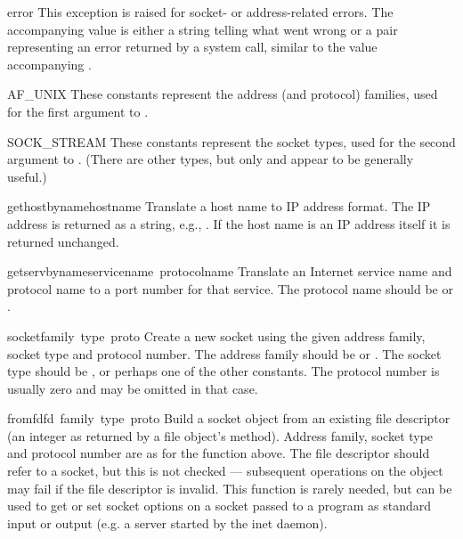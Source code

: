 \renewcommand{\indexsubitem}{(in module socket)}
\begin{excdesc}{error}
This exception is raised for socket- or address-related errors.
The accompanying value is either a string telling what went wrong or a
pair 
representing an error returned by a system
call, similar to the value accompanying .
\end{excdesc}

\begin{datadesc}{AF_UNIX}
These constants represent the address (and protocol) families,
used for the first argument to .
\end{datadesc}

\begin{datadesc}{SOCK_STREAM}
These constants represent the socket types,
used for the second argument to .
(There are other types, but only  and
 appear to be generally useful.)
\end{datadesc}

\begin{funcdesc}{gethostbyname}{hostname}
Translate a host name to IP address format.  The IP address is
returned as a string, e.g.,  .  If the host name
is an IP address itself it is returned unchanged.
\end{funcdesc}

\begin{funcdesc}{getservbyname}{servicename\, protocolname}
Translate an Internet service name and protocol name to a port number
for that service.  The protocol name should be  or
.
\end{funcdesc}

\begin{funcdesc}{socket}{family\, type\, proto}
Create a new socket using the given address family, socket type and
protocol number.  The address family should be  or
.  The socket type should be ,
 or perhaps one of the other  constants.
The protocol number is usually zero and may be omitted in that case.
\end{funcdesc}

\begin{funcdesc}{fromfd}{fd\, family\, type\, proto}
Build a socket object from an existing file descriptor (an integer as
returned by a file object's  method).  Address family,
socket type and protocol number are as for the  function
above.  The file descriptor should refer to a socket, but this is not
checked --- subsequent operations on the object may fail if the file
descriptor is invalid.  This function is rarely needed, but can be
used to get or set socket options on a socket passed to a program as
standard input or output (e.g. a server started by the \UNIX{} inet
daemon).
\end{funcdesc}

